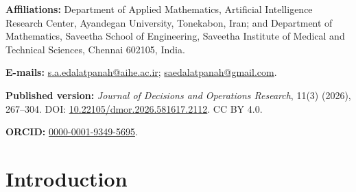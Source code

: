 \documentclass[reqno,11pt]{amsart}
\theoremstyle{definition}
\theoremstyle{plain}
\theoremstyle{remark}
\begin{document}
\begin{abstract}
\textbf{Originality/Value:}
PEJWAK establishes a generalizable design language for
profile-conditioned aggregation. It occupies an important methodological
space between direct weighted aggregation and parameter-intensive
nonadditive interaction models: it introduces endogenous
alternative-specific context without subset capacities, preserves
criterion identity, separates retention from final participation, and
supports complete decomposition and analytical auditing. Its value is
not merely a different ranking formula, but a criterion-level mechanism
through which each criterion preserves its identity while its expressed
contribution is conditioned by the profile of the alternative to which
it belongs.

\end{abstract}
\maketitle

\noindent\textbf{Affiliations:} Department of Applied Mathematics, Artificial Intelligence Research Center, Ayandegan University, Tonekabon, Iran; and Department of Mathematics, Saveetha School of Engineering, Saveetha Institute of Medical and Technical Sciences, Chennai 602105, India.\par
\noindent\textbf{E-mails:} \href{mailto:s.a.edalatpanah@aihe.ac.ir}{s.a.edalatpanah@aihe.ac.ir}; \href{mailto:saedalatpanah@gmail.com}{saedalatpanah@gmail.com}.\par
\noindent\textbf{Published version:} \emph{Journal of Decisions and Operations Research}, 11(3) (2026), 267--304. DOI: \href{https://doi.org/10.22105/dmor.2026.581617.2112}{10.22105/dmor.2026.581617.2112}. CC BY 4.0.\par
\noindent\textbf{ORCID:} \href{https://orcid.org/0000-0001-9349-5695}{0000-0001-9349-5695}.
\medskip

\section{Introduction}
\label{sec:introduction}
\end{document}
